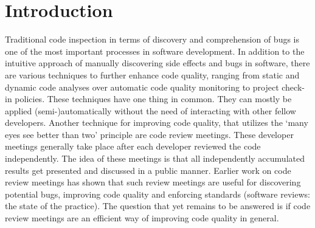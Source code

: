 \section{Introduction}
Traditional code inspection in terms of discovery and comprehension of bugs is one of the most important processes in software development.
In addition to the intuitive approach of manually discovering side effects and bugs in software, there are various techniques to further enhance code quality, ranging from static and dynamic code analyses over automatic code quality monitoring to project check-in policies.
These techniques have one thing in common. They can mostly be applied (semi-)automatically without the need of interacting with other fellow developers.
Another technique for improving code quality, that utilizes the ‘many eyes see better than two’ principle are code review meetings.
These developer meetings generally take place after each developer reviewed the code independently.
The idea of these meetings is that all independently accumulated results get presented and discussed in a public manner. 
Earlier work on code review meetings has shown that such review meetings are useful for discovering potential bugs, improving code quality and enforcing standards (software reviews: the state of the practice).
The question that yet remains to be answered is if code review meetings are an efficient way of improving code quality in general.